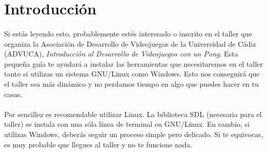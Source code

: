 \documentclass[16pt,spanish]{article}
\title{\titlename}
\author{\authorname}
\def \plpath{.}
\begin{document}









\section{Introducción}
\label{sec:intro}

\paragraph{}
Si estás leyendo esto, probablemente estés interesado o inscrito
en el taller que organiza la Asociación de Desarrollo de Videojuegos
de la Universidad de Cádiz (ADVUCA), \emph{Introducción al Desarrollo
de Videojuegos con un Pong}. Esta pequeña guía te ayudará a instalar
las herramientas que necesitaremos en el taller tanto si utilizas
un sistema GNU/Linux como Windows. Esto nos conseguirá que el taller sea
más dinámico y no perdamos tiempo en algo que puedes hacer en tu casas.

\paragraph{}
Por sencillez es recomendable utilizar Linux. La biblioteca SDL (necesaria
para el taller) se instala con una sóla línea de terminal en GNU/Linux.
En cambio, si utilizas Windows, deberás seguir un proceso simple pero delicado.
Si te equivocas, es muy probable que llegues al taller y no te funcione nada.
\end{document}
